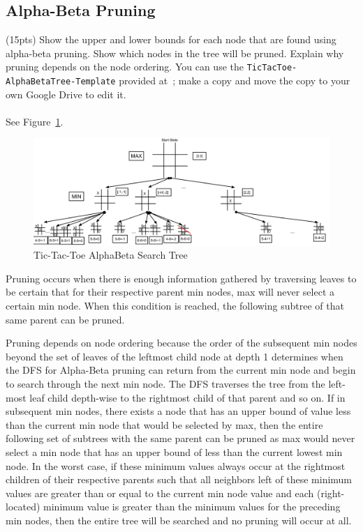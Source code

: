 \documentclass{article}
\begin{document}
\subsection{Alpha-Beta Pruning} (15pts) Show the upper and lower bounds for each node that are found using alpha-beta pruning. Show which nodes in the tree will be pruned. Explain why pruning depends on the node ordering. You can use the \texttt{TicTacToe-AlphaBetaTree-Template} provided at~\href{https://docs.google.com/drawings/d/1Uafusj47EC6_wIXe2KCkn_wBORsNegwYwHa6j_A3gBQ/edit?usp=sharing}{\color{blue}{HWs Public/HW2}}; make a copy and move the copy to your own Google Drive to edit it.\\
\\
See Figure~\ref{fig:alphabeta_tree}.
\begin{figure}[h]
    \centering
    \includegraphics[scale=0.2]{figures/AB_Solved_TicTacToe_SearchTree_Template.png}
    \caption{Tic-Tac-Toe AlphaBeta Search Tree}
    \label{fig:alphabeta_tree}
\end{figure}

Pruning occurs when there is enough information gathered by traversing leaves to be certain that for their respective parent min nodes, max will never select a certain min node. When this condition is reached, the following subtree of that same parent can be pruned.

Pruning depends on node ordering because the order of the subsequent min nodes beyond the set of leaves of the leftmost child node at depth 1 determines when the DFS for Alpha-Beta pruning can return from the current min node and begin to search through the next min node. The DFS traverses the tree from the left-most leaf child depth-wise to the rightmost child of that parent and so on. If in subsequent min nodes, there exists a node that has an upper bound of value less than the current min node that would be selected by max, then the entire following set of subtrees with the same parent can be pruned as max would never select a min node that has an upper bound of less than the current lowest min node. In the worst case, if these minimum values always occur at the rightmost children of their respective parents such that all neighbors left of these minimum values are greater than or equal to the current min node value and each (right-located) minimum value is greater than the minimum values for the preceding min nodes, then the entire tree will be searched and no pruning will occur at all.  \\
\end{document}
